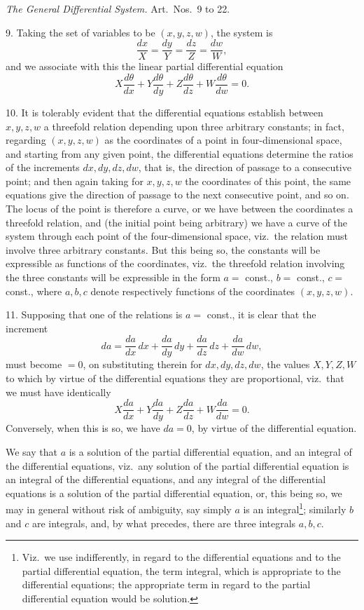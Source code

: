 \documentclass[11pt,a4paper]{article}
\begin{document}
\begin{center}
\emph{The General Differential System.} Art.\ Nos.\ 9 to 22.
\end{center}

\medskip

9. Taking the set of variables to be $(x, y, z, w)$, the system is
\[
\frac{dx}{X} = \frac{dy}{Y} = \frac{dz}{Z} = \frac{dw}{W},
\]
and we associate with this the linear partial differential equation
\[
X\frac{d\theta}{dx} + Y\frac{d\theta}{dy} + Z\frac{d\theta}{dz} + W\frac{d\theta}{dw} = 0.
\]

10. It is tolerably evident that the differential equations establish between $x, y, z, w$ a threefold relation depending upon three arbitrary constants; in fact, regarding $(x, y, z, w)$ as the coordinates of a point in four-dimensional space, and starting from any given point, the differential equations determine the ratios of the increments $dx, dy, dz, dw$, that is, the direction of passage to a consecutive point; and then again taking for $x, y, z, w$ the coordinates of this point, the same equations give the direction of passage to the next consecutive point, and so on. The locus of the point is therefore a curve, or we have between the coordinates a threefold relation, and (the initial point being arbitrary) we have a curve of the system through each point of the four-dimensional space, viz.\ the relation must involve three arbitrary constants. But this being so, the constants will be expressible as functions of the coordinates, viz.\ the threefold relation involving the three constants will be expressible in the form $a = $ const., $b = $ const., $c = $ const., where $a, b, c$ denote respectively functions of the coordinates $(x, y, z, w)$.

11. Supposing that one of the relations is $a = $ const., it is clear that the increment
\[
da = \frac{da}{dx}\,dx + \frac{da}{dy}\,dy + \frac{da}{dz}\,dz + \frac{da}{dw}\,dw,
\]
must become $= 0$, on substituting therein for $dx, dy, dz, dw$, the values $X, Y, Z, W$ to which by virtue of the differential equations they are proportional, viz.\ that we must have identically
\[
X\frac{da}{dx} + Y\frac{da}{dy} + Z\frac{da}{dz} + W\frac{da}{dw} = 0.
\]
Conversely, when this is so, we have $da = 0$, by virtue of the differential equation.

We say that $a$ is a solution of the partial differential equation, and an integral of the differential equations, viz.\ any solution of the partial differential equation is an integral of the differential equations, and any integral of the differential equations is a solution of the partial differential equation, or, this being so, we may in general without risk of ambiguity, say simply $a$ is an integral\footnote{Viz.\ we use indifferently, in regard to the differential equations and to the partial differential equation, the term integral, which is appropriate to the differential equations; the appropriate term in regard to the partial differential equation would be solution.}; similarly $b$ and $c$ are integrals, and, by what precedes, there are three integrals $a, b, c$.
\end{document}
